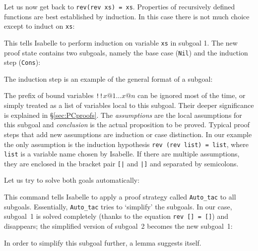 Let us now get back to \texttt{rev(rev xs) = xs}. Properties of recursively
defined functions are best established by induction. In this case there is
not much choice except to induct on \texttt{xs}:
\begin{ttbox}
\end{ttbox}
This tells Isabelle to perform induction on variable \texttt{xs} in subgoal
1. The new proof state contains two subgoals, namely the base case
(\texttt{Nil}) and the induction step (\texttt{Cons}):
\begin{ttbox}
\end{ttbox}
The induction step is an example of the general format of a subgoal:
\begin{ttbox}
\end{ttbox}
The prefix of bound variables \texttt{!!\(x@1 \dots x@n\)} can be ignored
most of the time, or simply treated as a list of variables local to this
subgoal. Their deeper significance is explained in \S\ref{sec:PCproofs}.  The
{\it assumptions} are the local assumptions for this subgoal and {\it
  conclusion} is the actual proposition to be proved. Typical proof steps
that add new assumptions are induction or case distinction. In our example
the only assumption is the induction hypothesis \texttt{rev (rev list) =
  list}, where \texttt{list} is a variable name chosen by Isabelle. If there
are multiple assumptions, they are enclosed in the bracket pair
\texttt{[|} and \texttt{|]}
and separated by semicolons.

Let us try to solve both goals automatically:
\begin{ttbox}
\end{ttbox}
This command tells Isabelle to apply a proof strategy called
\texttt{Auto_tac} to all subgoals. Essentially, \texttt{Auto_tac} tries to
`simplify' the subgoals.  In our case, subgoal~1 is solved completely (thanks
to the equation \texttt{rev [] = []}) and disappears; the simplified version
of subgoal~2 becomes the new subgoal~1:
\begin{ttbox}\makeatother
{}
\end{ttbox}
In order to simplify this subgoal further, a lemma suggests itself.


